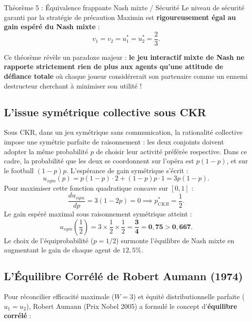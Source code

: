 \documentclass[11pt,a4paper]{article}
\begin{document}
\begin{propbox}{Théorème 5 : Équivalence frappante Nash mixte / Sécurité}
Le niveau de sécurité garanti par la stratégie de précaution Maximin est \textbf{rigoureusement égal au gain espéré du Nash mixte} :
\begin{equation}
v_1 = v_2 = u_1^* = u_2^* = \frac{2}{3}.
\end{equation}
\end{propbox}
Ce théorème révèle un paradoxe majeur : \textbf{le jeu interactif mixte de Nash ne rapporte strictement rien de plus aux agents qu'une attitude de défiance totale} où chaque joueur considérerait son partenaire comme un ennemi destructeur cherchant à minimiser son utilité !

\subsection{L'issue symétrique collective sous CKR}
Sous CKR, dans un jeu symétrique sans communication, la rationalité collective impose une symétrie parfaite de raisonnement : les deux conjoints doivent adopter la même probabilité $p$ de choisir leur activité préférée respective.
Dans ce cadre, la probabilité que les deux se coordonnent sur l'opéra est $p(1-p)$, et sur le football $(1-p)p$. L'espérance de gain symétrique s'écrit :
\begin{equation}
u_{sym}(p) = p(1-p) \cdot 2 + (1-p)p \cdot 1 = 3p(1-p).
\end{equation}
Pour maximiser cette fonction quadratique concave sur $[0, 1]$ :
\[
\frac{d u_{sym}}{dp} = 3(1 - 2p) = 0 \implies \boxed{p_{CKR}^* = \frac{1}{2}}.
\]
Le gain espéré maximal sous raisonnement symétrique atteint :
\begin{equation}
u_{sym}\left(\frac{1}{2}\right) = 3 \times \frac{1}{2} \times \frac{1}{2} = \mathbf{\frac{3}{4} = 0{,}75 > 0{,}667}.
\end{equation}
Le choix de l'équiprobabilité ($p=1/2$) surmonte l'équilibre de Nash mixte en augmentant le gain de chaque agent de $12{,}5\%$.

\subsection{L'Équilibre Corrélé de Robert Aumann (1974)}
Pour réconcilier efficacité maximale ($W = 3$) et équité distributionnelle parfaite ($u_1 = u_2$), Robert Aumann (Prix Nobel 2005) a formulé le concept d'\textbf{équilibre corrélé} :
\end{document}
